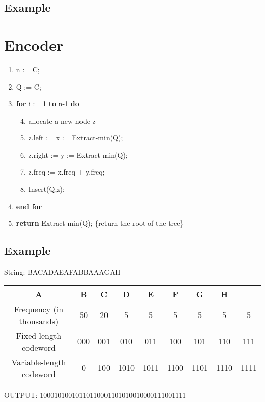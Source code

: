 \subsection{Example}

\section{Encoder}
\begin{enumerate}
\tightlist
\item
  n := \textbar{}C\textbar{};
\item
  Q := C;
\item
  \textbf{for} i := 1 \textbf{to} n-1 \textbf{do}
  \begin{enumerate}
  \setcounter{enumii}{3}
  \tightlist
  \item
    allocate a new node z
  \item
    z.left := x := Extract-min(Q);
  \item
    z.right := y := Extract-min(Q);
  \item
    z.freq := x.freq + y.freq;
  \item
    Insert(Q,z);
  \end{enumerate}
\item
  \textbf{end for}
\item
  \textbf{return} Extract-min(Q); \{return the root of the tree\}
\end{enumerate}

\subsection{Example}

String: BACADAEAFABBAAAGAH

\begin{tabular}{ccccccccc}
  A & B & C & D & E & F & G & H\\
  \hline
 Frequency (in thousands) & 50 & 20 & 5 & 5 & 5 & 5 & 5 & 5 \\
 Fixed-length codeword & 000 & 001 & 010 & 011 & 100 & 101 & 110 & 111 \\
 Variable-length codeword & 0 & 100 & 1010 & 1011 & 1100 & 1101 & 1110 & 1111
\end{tabular}


OUTPUT: 10001010010110110001101010010000111001111

